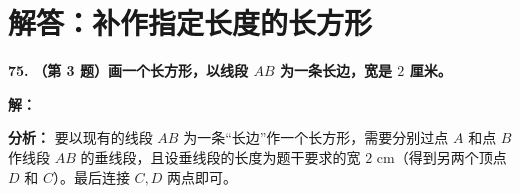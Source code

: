 \newpage



\section{解答：补作指定长度的长方形}

\vspace{0.6cm}

\textbf{\LARGE 75.} \textbf{（第 3 题）画一个长方形，以线段 $AB$ 为一条长边，宽是 $2$ 厘米。}

\vspace{0.4cm}
\textbf{解：}

\textbf{分析：} 要以现有的线段 $AB$ 为一条“长边”作一个长方形，需要分别过点 $A$ 和点 $B$ 作线段 $AB$ 的垂线段，且设垂线段的长度为题干要求的宽 $2\text{ cm}$（得到另两个顶点 $D$ 和 $C$）。最后连接 $C, D$ 两点即可。

